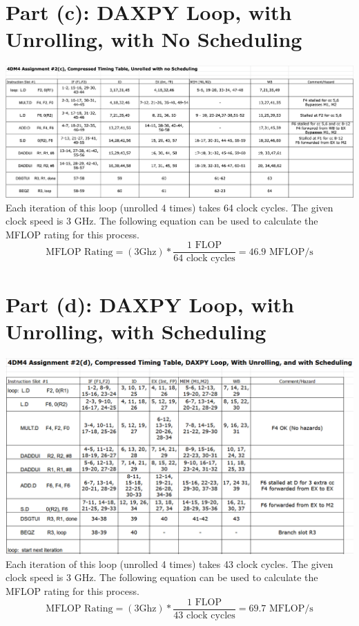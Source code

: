 \documentclass[12pt, letterpaper, titlepage, hidelinks]{article}
\begin{document}
\section{Part (c): DAXPY Loop, with Unrolling, with No Scheduling}
	\includegraphics[width=\textwidth]{2c}
	Each iteration of this loop (unrolled 4 times) takes 64 clock cycles. The given clock speed is 3 GHz. The following equation can be used to calculate the MFLOP rating for this process.
	\begin{equation}
		\text{MFLOP Rating} = (3 \text{{Ghz}}) * \frac{1 \text{ FLOP}}{64 \text{ clock cycles}} = 46.9 \text{ MFLOP/s}
	\end{equation}

\section{Part (d): DAXPY Loop, with Unrolling, with Scheduling}
	\includegraphics[width=\textwidth]{2d}
	Each iteration of this loop (unrolled 4 times) takes 43 clock cycles. The given clock speed is 3 GHz. The following equation can be used to calculate the MFLOP rating for this process.
	\begin{equation}
		\text{MFLOP Rating} = (3 \text{{Ghz}}) * \frac{1 \text{ FLOP}}{43 \text{ clock cycles}} = 69.7 \text{ MFLOP/s}
	\end{equation}
\end{document}
